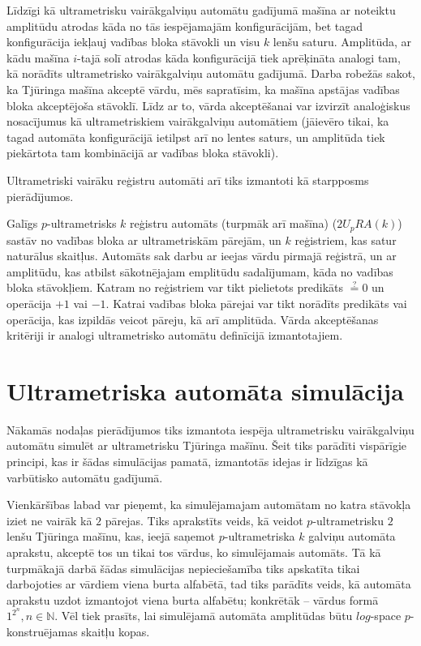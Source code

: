 \documentclass{ludis}
\begin{document}
Līdzīgi kā ultrametrisku vairākgalviņu automātu gadījumā mašīna ar noteiktu amplitūdu atrodas kāda no tās iespējamajām konfigurācijām, bet tagad konfigurācija iekļauj vadības bloka stāvokli un visu $k$ lenšu saturu. Amplitūda, ar kādu mašīna $i$-tajā solī atrodas kāda konfigurācijā tiek aprēķināta analogi tam, kā norādīts ultrametrisko vairākgalviņu automātu gadījumā. Darba robežās sakot, ka Tjūringa mašīna akceptē vārdu, mēs sapratīsim, ka mašīna apstājas vadības bloka akceptējoša stāvoklī. Līdz ar to, vārda akceptēšanai var izvirzīt analoģiskus nosacījumus kā ultrametriskiem vairākgalviņu automātiem (jāievēro tikai, ka tagad automāta konfigurācijā ietilpst arī no lentes saturs, un amplitūda tiek piekārtota tam kombinācijā ar vadības bloka stāvokli).

Ultrametriski vairāku reģistru automāti arī tiks izmantoti kā starpposms pierādījumos.
\begin{definicija}
Galīgs $p$-ultrametrisks $k$ reģistru automāts (turpmāk arī mašīna) ($2U_pRA(k)$) sastāv no vadības bloka ar ultrametriskām pārejām, un $k$ reģistriem, kas satur naturālus skaitļus. Automāts sak darbu ar ieejas vārdu pirmajā reģistrā, un ar amplitūdu, kas atbilst sākotnējajam emplitūdu sadalījumam, kāda no vadības bloka stāvokļiem. Katram no reģistriem var tikt pielietots predikāts $\stackrel{?}{=} 0$ un operācija $+1$ vai $-1$. Katrai vadības bloka pārejai var tikt norādīts predikāts vai operācija, kas izpildās veicot pāreju, kā arī amplitūda. Vārda akceptēšanas kritēriji ir analogi ultrametrisko automātu definīcijā izmantotajiem.
\end{definicija}

\section{Ultrametriska automāta simulācija}
Nākamās nodaļas pierādījumos tiks izmantota iespēja ultrametrisku vairākgalviņu automātu simulēt ar ultrametrisku Tjūringa mašīnu. Šeit tiks parādīti vispārīgie principi, kas ir šādas simulācijas pamatā, izmantotās idejas ir līdzīgas kā ~\citep{Macarie1995} varbūtisko automātu gadījumā.

Vienkāršības labad var pieņemt, ka simulējamajam automātam no katra stāvokļa iziet ne vairāk kā $2$ pārejas. Tiks aprakstīts veids, kā veidot $p$-ultrametrisku $2$ lenšu Tjūringa mašīnu, kas, ieejā saņemot $p$-ultrametriska $k$ galviņu automāta aprakstu, akceptē tos un tikai tos vārdus, ko simulējamais automāts. Tā kā turpmākajā darbā šādas simulācijas nepieciešamība tiks apskatīta tikai darbojoties ar vārdiem viena burta alfabētā, tad tiks parādīts veids, kā automāta aprakstu uzdot izmantojot viena burta alfabētu; konkrētāk -- vārdus formā $1^{2^n}, n \in \mathbb{N}$. Vēl tiek prasīts, lai simulējamā automāta amplitūdas būtu $log$-space $p$-konstruējamas skaitļu kopas.
\end{document}
